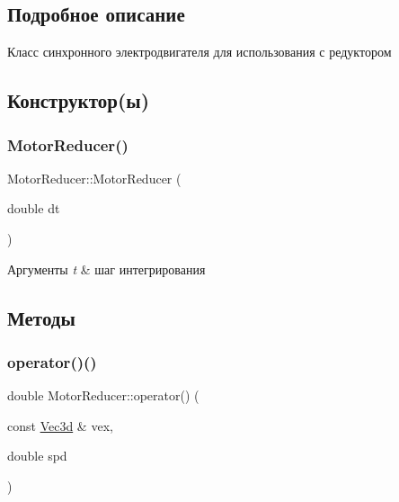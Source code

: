 \subsection{Подробное описание}
Класс синхронного электродвигателя для использования с редуктором 

\subsection{Конструктор(ы)}
\mbox{\label{classMotorReducer_a85ac4fe9831900c6697ee80ff0cc3d32}} 
\subsubsection{\texorpdfstring{Motor\+Reducer()}{MotorReducer()}}
{\footnotesize\ttfamily Motor\+Reducer\+::\+Motor\+Reducer (\begin{DoxyParamCaption}\item[{double}]{dt }\end{DoxyParamCaption})\hspace{0.3cm}{\ttfamily [inline]}}


\begin{DoxyParams}{Аргументы}
{\em t} & шаг интегрирования \\
\hline
\end{DoxyParams}


\subsection{Методы}
\mbox{\label{classMotorReducer_a29141a375c33d409928f40962fcd4011}} 
\subsubsection{\texorpdfstring{operator()()}{operator()()}}
{\footnotesize\ttfamily double Motor\+Reducer\+::operator() (\begin{DoxyParamCaption}\item[{const \hyperlink{structVec3}{Vec3d} \&}]{vex,  }\item[{double}]{spd }\end{DoxyParamCaption})\hspace{0.3cm}{\ttfamily [inline]}}



